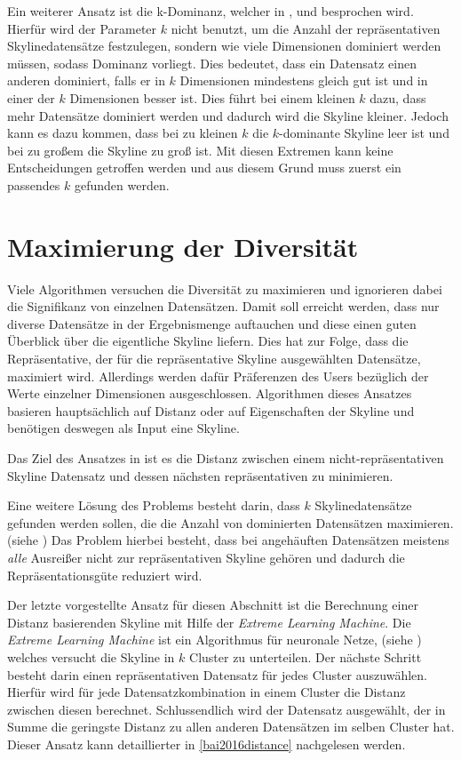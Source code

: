 Ein weiterer Ansatz ist die k-Dominanz, welcher in \cite{Chan:2006:FKS:1142473.1142530}, \cite{Chan:2006:HDS:2117976.2118017} und \cite{5480364} besprochen wird. Hierfür wird der Parameter $k$ nicht benutzt, um die Anzahl der repräsentativen Skylinedatensätze festzulegen, sondern wie viele Dimensionen dominiert werden müssen, sodass Dominanz vorliegt. Dies bedeutet, dass ein Datensatz einen anderen dominiert, falls er  in $k$ Dimensionen mindestens gleich gut ist und in einer der $k$ Dimensionen besser ist. Dies führt bei einem kleinen $k$ dazu, dass mehr Datensätze dominiert werden und dadurch wird die Skyline kleiner. Jedoch kann es dazu kommen, dass bei zu kleinen $k$ die $k$-dominante Skyline leer ist und bei zu großem die Skyline zu groß ist. Mit diesen Extremen kann keine Entscheidungen getroffen werden und aus diesem Grund muss zuerst ein passendes $k$ gefunden werden.
\section{Maximierung der Diversität}
\label{ch:Forschungsstand:sec:maxDiv}
Viele Algorithmen versuchen die Diversität zu maximieren und ignorieren dabei die Signifikanz von einzelnen Datensätzen. Damit soll erreicht werden, dass nur diverse Datensätze in der Ergebnismenge auftauchen und diese einen guten Überblick über die eigentliche Skyline liefern.
Dies hat zur Folge, dass die Repräsentative, der für die repräsentative Skyline ausgewählten Datensätze, maximiert wird. Allerdings werden dafür Präferenzen des Users bezüglich der Werte einzelner Dimensionen ausgeschlossen. Algorithmen dieses Ansatzes basieren hauptsächlich auf Distanz oder auf Eigenschaften der Skyline und benötigen deswegen als Input eine Skyline. 

Das Ziel des Ansatzes in \cite{Tao:2009:DRS:1546683.1547325} ist es die Distanz zwischen einem nicht-repräsentativen Skyline Datensatz und dessen nächsten repräsentativen zu minimieren. 

Eine weitere Lösung des Problems besteht darin, dass $k$ Skylinedatensätze gefunden werden sollen, die die Anzahl von dominierten Datensätzen maximieren. (siehe \cite{4221657}) Das Problem hierbei besteht, dass bei angehäuften Datensätzen meistens \textit{alle} Ausreißer nicht zur repräsentativen Skyline gehören und dadurch die Repräsentationsgüte reduziert wird.

Der letzte vorgestellte Ansatz für diesen Abschnitt ist die Berechnung einer Distanz basierenden Skyline mit Hilfe der \textit{Extreme Learning Machine}. Die \textit{Extreme Learning Machine} ist ein Algorithmus für neuronale Netze, (siehe \cite{huang2006extreme}) welches versucht die Skyline in $k$ Cluster zu unterteilen. Der nächste Schritt besteht darin einen repräsentativen Datensatz für jedes Cluster auszuwählen. Hierfür wird für jede Datensatzkombination in einem Cluster die Distanz zwischen diesen berechnet. Schlussendlich wird der Datensatz ausgewählt, der in Summe die geringste Distanz zu allen anderen Datensätzen im selben Cluster hat. Dieser Ansatz kann detaillierter in \ref{bai2016distance} nachgelesen werden.
